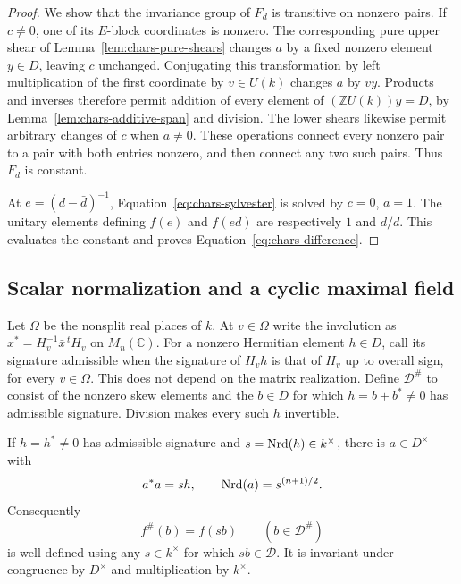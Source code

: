 \begin{proof}
We show that the invariance group of $F_d$ is transitive on nonzero
pairs. If $c\ne0$, one of its $E$-block coordinates is nonzero. The
corresponding pure upper shear of Lemma~\ref{lem:chars-pure-shears}
changes $a$ by a fixed nonzero element $y\in D$, leaving $c$ unchanged.
Conjugating this transformation by left multiplication of the first
coordinate by $v\in U(k)$ changes $a$ by $vy$. Products and inverses
therefore permit addition of every element of $(\mathbb ZU(k))y=D$,
by Lemma~\ref{lem:chars-additive-span} and division. The lower shears
likewise permit arbitrary changes of $c$ when $a\ne0$. These operations
connect every nonzero pair to a pair with both entries nonzero, and then
connect any two such pairs. Thus $F_d$ is constant.

At $e=(d-\bar d)^{-1}$, Equation~\ref{eq:chars-sylvester} is solved
by $c=0$, $a=1$. The unitary elements defining $f(e)$ and $f(ed)$ are
respectively $1$ and $\bar d/d$. This evaluates the constant and proves
Equation~\ref{eq:chars-difference}.
\end{proof}

\subsection{Scalar normalization and a cyclic maximal field}

Let $\Omega$ be the nonsplit real places of $k$. At $v\in\Omega$
write the involution as $x^*=H_v^{-1}\bar x^{\,t}H_v$ on
$M_n(\mathbb C)$. For a nonzero Hermitian element $h\in D$, call its
signature admissible when the signature of $H_vh$ is that of $H_v$ up
to overall sign, for every $v\in\Omega$. This does not depend on the
matrix realization. Define $\mathcal D^\#$ to consist of the nonzero
skew elements and the $b\in D$ for which $h=b+b^*\ne0$ has admissible
signature. Division makes every such $h$ invertible.

\begin{lemma}\label{lem:chars-normalization}
If $h=h^*\ne0$ has admissible signature and $s=\operatorname{Nrd}(h)\in k^\times$,
there is $a\in D^\times$ with
\begin{equation}\label{eq:chars-normalized-norm}
 a^*a=sh,\qquad \operatorname{Nrd}(a)=s^{(n+1)/2}.
\end{equation}
Consequently
\[
 f^\#(b)=f(sb)\qquad(b\in\mathcal D^\#)
\]
is well-defined using any $s\in k^\times$ for which $sb\in\mathcal D$.
It is invariant under congruence by $D^\times$ and multiplication by
$k^\times$.
\end{lemma}

